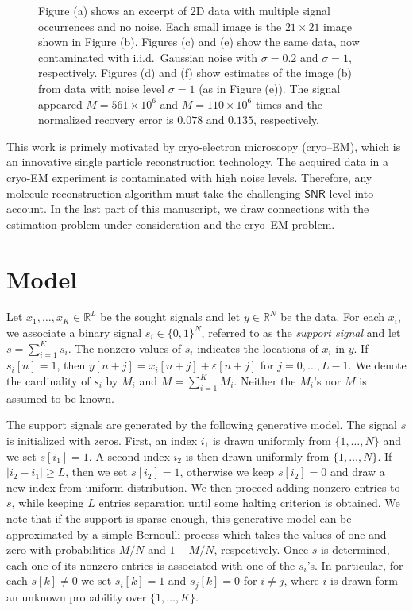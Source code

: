 \documentclass[english,11pt]{article}
\numberwithin{equation}{section}
\theoremstyle{plain}
\theoremstyle{definition}
\theoremstyle{remark}
\theoremstyle{plain}
\theoremstyle{remark}
\theoremstyle{plain}
\theoremstyle{plain}
\newcommand{\RL}{\mathbb{R}^L}
\newcommand{\RN}{\mathbb{R}^N}
\newcommand{\SNR}{{\textsf{SNR}}}
\begin{document}
\begin{figure}
\caption{Figure (a) shows an excerpt of 2D data with multiple signal occurrences and no noise. Each small image is the $21\times 21$ image shown in Figure (b). Figures (c) and (e) show the same data, now contaminated with i.i.d.\ Gaussian noise with $\sigma=0.2$ and $\sigma=1$, respectively. Figures (d) and (f) show estimates of the image (b) from data with noise level $\sigma=1$ (as in Figure (e)). The signal appeared $M = 561\times 10^6$ and $M = 110\times 10^6$ times and the normalized recovery error is  $0.078$ and $0.135$, respectively.}
\label{fig:example}
\end{figure}



This work is primely motivated by cryo-electron microscopy (cryo--EM), which is an innovative  single particle reconstruction technology. The acquired data in a cryo-EM experiment is contaminated with high noise levels. Therefore, any molecule reconstruction algorithm must take  the challenging $\SNR$ level into account.  In the last part of this manuscript, we draw connections with the estimation problem under consideration and the cryo--EM problem.


\section{Model}  \label{sec:model}

Let $x_1,\ldots,x_K\in\RL$ be the sought signals and let $y\in\RN$ be the data. For each $x_i$, we associate a binary signal  $s_i\in\{0,1\}^N$, referred to as the \emph{support signal} and let $s = \sum_{i=1}^Ks_i$. The nonzero values of $s_i$ indicates the locations of $x_i$ in $y$. If $s_i[n]=1$, then $y[n+j] = x_i[n+j]+\varepsilon[n+j]$ for $j=0,\ldots,L-1$.
We denote the cardinality of $s_i$ by $M_i$  and $M = \sum_{i=1}^{K}M_i$. Neither the $M_i$'s nor $M$ is assumed to be known.


The support signals are generated by the following generative model. The signal $s$ is initialized with zeros.
First, an index $i_1$ is drawn uniformly from $\{1,\ldots,N\}$ and we set $s[i_1]=1$. A second index $i_2$ is then drawn uniformly from $\{1,\ldots,N\}$. If $\vert i_2-i_1\vert \geq L$,
then we set $s[i_2]=1$, otherwise we keep $s[i_2]=0$ and draw a new index  from uniform distribution. We then proceed adding  nonzero entries to $s$,  while keeping $L$  entries separation until some halting criterion is obtained. 
We note that if the support is sparse enough, this generative model can be approximated by a simple Bernoulli process which takes the values of one and zero with probabilities  $M/N$ and $1-M/N$, respectively.
Once $s$ is determined, each one of its nonzero entries is associated with one of the $s_i$'s. 
In particular, for each $s[k]\neq 0$ we set $s_i[k] = 1$ and $s_j[k] = 0$ for $i\neq j$, where $i$ is drawn form an unknown probability over  $\{1,\ldots,K\}$. 
\end{document}
